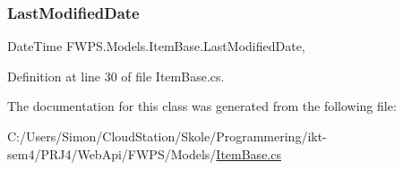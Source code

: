 \subsubsection{\texorpdfstring{Last\+Modified\+Date}{LastModifiedDate}}
{\footnotesize\ttfamily Date\+Time F\+W\+P\+S.\+Models.\+Item\+Base.\+Last\+Modified\+Date\hspace{0.3cm}{\ttfamily [get]}, {\ttfamily [set]}}



Definition at line 30 of file Item\+Base.\+cs.



The documentation for this class was generated from the following file\+:\begin{DoxyCompactItemize}
\item 
C\+:/\+Users/\+Simon/\+Cloud\+Station/\+Skole/\+Programmering/ikt-\/sem4/\+P\+R\+J4/\+Web\+Api/\+F\+W\+P\+S/\+Models/\mbox{\hyperlink{_web_api_2_f_w_p_s_2_models_2_item_base_8cs}{Item\+Base.\+cs}}\end{DoxyCompactItemize}
